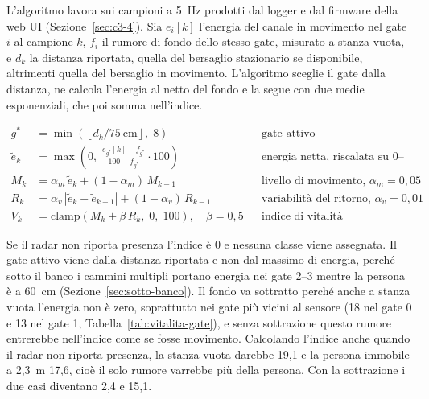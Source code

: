 L'algoritmo lavora sui campioni a 5~Hz prodotti dal logger e dal firmware della web UI (Sezione~\ref{sec:c3-4}). Sia $e_i[k]$ l'energia del canale in movimento nel gate $i$ al campione $k$, $f_i$ il rumore di fondo dello stesso gate, misurato a stanza vuota, e $d_k$ la distanza riportata, quella del bersaglio stazionario se disponibile, altrimenti quella del bersaglio in movimento. L'algoritmo sceglie il gate dalla distanza, ne calcola l'energia al netto del fondo e la segue con due medie esponenziali, che poi somma nell'indice.

\begin{align}
g^{*} &= \min\!\left(\left\lfloor d_k / 75~\text{cm} \right\rfloor,\; 8\right)
  && \text{gate attivo} \label{eq:gate-attivo}\\
\tilde e_k &= \max\!\left(0,\; \frac{e_{g^{*}}[k] - f_{g^{*}}}{100 - f_{g^{*}}} \cdot 100\right)
  && \text{energia netta, riscalata su 0--100} \label{eq:netta}\\
M_k &= \alpha_m\, \tilde e_k + (1-\alpha_m)\, M_{k-1}
  && \text{livello di movimento, } \alpha_m = 0{,}05 \label{eq:livello}\\
R_k &= \alpha_v\, \left|\tilde e_k - \tilde e_{k-1}\right| + (1-\alpha_v)\, R_{k-1}
  && \text{variabilità del ritorno, } \alpha_v = 0{,}01 \label{eq:variabilita}\\
V_k &= \mathrm{clamp}\!\left(M_k + \beta\, R_k,\; 0,\; 100\right), \quad \beta = 0{,}5
  && \text{indice di vitalità} \label{eq:vitalita}
\end{align}

Se il radar non riporta presenza l'indice è 0 e nessuna classe viene assegnata. Il gate attivo viene dalla distanza riportata e non dal massimo di energia, perché sotto il banco i cammini multipli portano energia nei gate 2--3 mentre la persona è a 60~cm (Sezione~\ref{sec:sotto-banco}). Il fondo va sottratto perché anche a stanza vuota l'energia non è zero, soprattutto nei gate più vicini al sensore (18 nel gate 0 e 13 nel gate 1, Tabella~\ref{tab:vitalita-gate}), e senza sottrazione questo rumore entrerebbe nell'indice come se fosse movimento. Calcolando l'indice anche quando il radar non riporta presenza, la stanza vuota darebbe 19,1 e la persona immobile a 2,3~m 17,6, cioè il solo rumore varrebbe più della persona. Con la sottrazione i due casi diventano 2,4 e 15,1.

